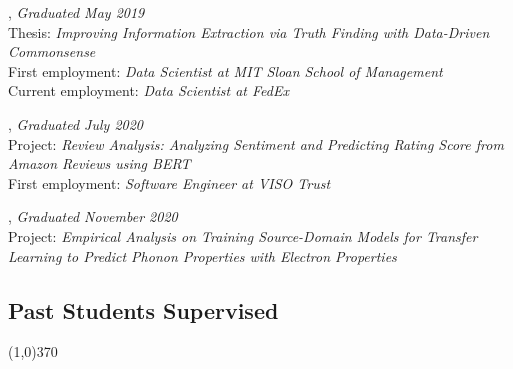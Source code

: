 \documentclass[10pt]{article}
\newenvironment{myindentpar}[1]%
{\begin{list}{}%
         {\setlength{\leftmargin}{#1}}%
         \item[]%
}
{\end{list}}
\newcounter{list}
\begin{document}
\begin{myindentpar}{0.75cm}

\hspace{-0.75cm}{\bf Xueying Wang}, \textit{Graduated May 2019} \\
	{Thesis: \textit{Improving Information Extraction via Truth Finding with Data-Driven Commonsense}} \\
	{First employment: \textit{Data Scientist at MIT Sloan School of Management}} \\
	{Current employment: \textit{Data Scientist at FedEx}}

\hspace{-0.75cm}{\bf Bhakti Sharma}, \textit{Graduated July 2020} \\
	{Project: \textit{Review Analysis: Analyzing Sentiment and Predicting Rating Score from Amazon Reviews using BERT}} \\
	{First employment: \textit{Software Engineer at VISO Trust}}

\hspace{-0.75cm}{\bf Jianing Li}, \textit{Graduated November 2020} \\
	{Project: \textit{Empirical Analysis on Training Source-Domain Models for Transfer Learning to Predict Phonon Properties with Electron Properties}}

\end{myindentpar}

\subsection{\sc Past Students Supervised}
\vspace{-0.4cm} \line(1,0){370} \vspace{-0.1cm}
\end{document}

